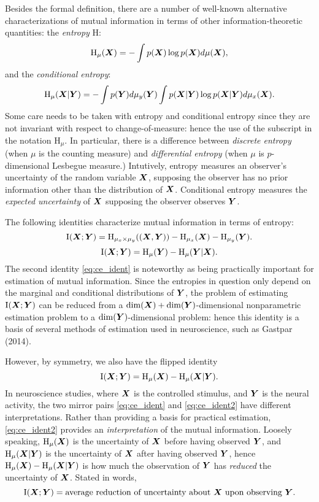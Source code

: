 Besides the formal definition, there are a number of well-known alternative
characterizations of mutual information in terms of other
information-theoretic quantities: the \emph{entropy} $\text{H}$:
\[
\text{H}_\mu(\boldsymbol{X}) = -\int p(\boldsymbol{X}) \log p(\boldsymbol{X}) d\mu(\boldsymbol{X}),
\]
and the \emph{conditional entropy}:
\[
\text{H}_\mu(\boldsymbol{X}|\boldsymbol{Y}) = -\int p(\boldsymbol{Y}) d\mu_y(\boldsymbol{Y}) \int p(\boldsymbol{X}|\boldsymbol{Y}) \log p(\boldsymbol{X}|\boldsymbol{Y}) d\mu_x(\boldsymbol{X}).
\]
Some care needs to be taken with entropy and conditional entropy since
they are not invariant with respect to change-of-measure: hence the
use of the subscript in the notation $\text{H}_\mu$.  In particular,
there is a difference between \emph{discrete entropy} (when $\mu$ is
the counting measure) and \emph{differential entropy} (when $\mu$ is
$p$-dimensional Lesbegue measure.)  Intutively, entropy measures an
observer's uncertainty of the random variable $\boldsymbol{X}$, supposing the
observer has no prior information other than the distribution of
$\boldsymbol{X}$. Conditional entropy measures the \emph{expected uncertainty} of
$\boldsymbol{X}$ supposing the observer observes $\boldsymbol{Y}$.

The following identities characterize mutual information in terms of entropy:
\[
\text{I}(\boldsymbol{X}; \boldsymbol{Y}) = \text{H}_{\mu_x \times \mu_y}((\boldsymbol{X}, \boldsymbol{Y})) - \text{H}_{\mu_x}(\boldsymbol{X}) - \text{H}_{\mu_y}(\boldsymbol{Y}).
\]
\begin{equation}\label{eq:ce_ident}
\text{I}(\boldsymbol{X}; \boldsymbol{Y}) = \text{H}_\mu(\boldsymbol{Y}) - \text{H}_\mu(\boldsymbol{Y}|\boldsymbol{X}).
\end{equation}
The second identity \eqref{eq:ce_ident} is noteworthy
as being practically important for estimation of mutual information.
Since the entropies in question only depend on the marginal and
conditional distributions of $\boldsymbol{Y}$, the problem of estimating
$\text{I}(\boldsymbol{X}; \boldsymbol{Y})$ can be reduced from a $\dim(\boldsymbol{X})
+ \dim(\boldsymbol{Y})$-dimensional nonparametric estimation problem to a
$\dim(\boldsymbol{Y})$-dimensional problem: hence this identity is a basis of
several methods of estimation used in neuroscience, such as Gastpar
(2014).

However, by symmetry, we also have the flipped identity
\begin{equation}\label{eq:ce_ident2}
\text{I}(\boldsymbol{X}; \boldsymbol{Y}) = \text{H}_\mu(\boldsymbol{X}) - \text{H}_\mu(\boldsymbol{X}|\boldsymbol{Y}).
\end{equation}
In neuroscience studies, where $\boldsymbol{X}$ is the controlled stimulus, and
$\boldsymbol{Y}$ is the neural activity, the two mirror pairs \eqref{eq:ce_ident}
and \eqref{eq:ce_ident2} have different interpretations.  Rather than
providing a basis for practical estimation, \eqref{eq:ce_ident2}
provides an \emph{interpretation} of the mutual information.  Loosely
speaking, $\text{H}_\mu(\boldsymbol{X})$ is the uncertainty of $\boldsymbol{X}$ before
having observed $\boldsymbol{Y}$, and $\text{H}_\mu(\boldsymbol{X}|\boldsymbol{Y})$ is the uncertainty
of $\boldsymbol{X}$ after having observed $\boldsymbol{Y}$, hence $\text{H}_\mu(\boldsymbol{X})
- \text{H}_\mu(\boldsymbol{X}|\boldsymbol{Y})$ is how much the observation of $\boldsymbol{Y}$
has \emph{reduced} the uncertainty of $\boldsymbol{X}$.  Stated in words,
\[
\text{I}(\boldsymbol{X}; \boldsymbol{Y}) = \text{average reduction of uncertainty about $\boldsymbol{X}$ upon observing $\boldsymbol{Y}$}.
\]

